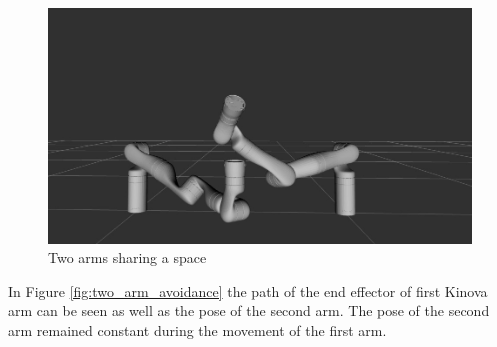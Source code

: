 \documentclass[a4paper, 11.5pt, conference]{ieeeconf}      %
\begin{document}
\begin{figure}[H]
	\centering
	\includegraphics[scale=0.15]{images/two_arms.jpeg}
	\caption{Two arms sharing a space}
	\label{fig:two_arms}
\end{figure}

In Figure \ref{fig:two_arm_avoidance} the path of the end effector of first Kinova arm can be seen as well as the pose of the second arm. The pose of the second arm remained constant during the movement of the first arm. 
\end{document}
